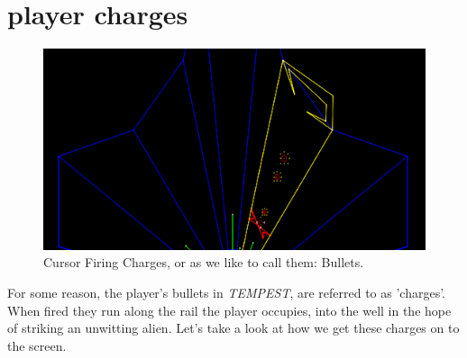 \chapter{player charges}
\label{sec:charges}
\lhead[tempest]{}
\lstset{style=6502Style}

\begin{figure}[H]
    \centering
    \begin{adjustbox}{width=11cm,center}
      \includegraphics[width=12cm]{src/bullets/bullets.png}%
    \end{adjustbox}
  \caption*{Cursor Firing Charges, or as we like to call them: Bullets.}
\end{figure}

For some reason, the player's bullets in \textit{TEMPEST}, are referred to as 'charges'.
When fired they run along the rail the player occupies, into the well in the hope of striking
an unwitting alien. Let's take a look at how we get these charges on to the screen.


